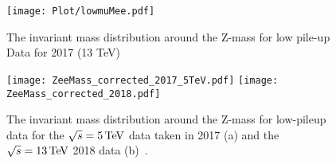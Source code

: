 \begin{figure}[H]
	\center
	\texttt{[image: Plot/lowmuMee.pdf]}
	\caption{The invariant mass distribution around the Z-mass for low pile-up Data for 2017 (13 TeV)~\cite{int_note_electrons}}
	\label{fig:mee-lowmu-data-vs-MC}
\end{figure}
\begin{figure}[H]
\begin{center}
    {{\texttt{[image: ZeeMass\_corrected\_2017\_5TeV.pdf]}
    }}
    {{\texttt{[image: ZeeMass\_corrected\_2018.pdf]}
    }}
    \caption{ The invariant mass distribution around the Z-mass for low-pileup data for the $\sqrt{s}=5\,\text{Te\kern -0.1em V}$ data taken in 2017 (a) and the $\sqrt{s}=13\,\text{Te\kern -0.1em V}$ 2018 data (b)~\cite{int_note_electrons}.}
    \label{fig:alpha-highmu-lowmu-thresh-corr}
\end{center}
\end{figure}

\clearpage
	
